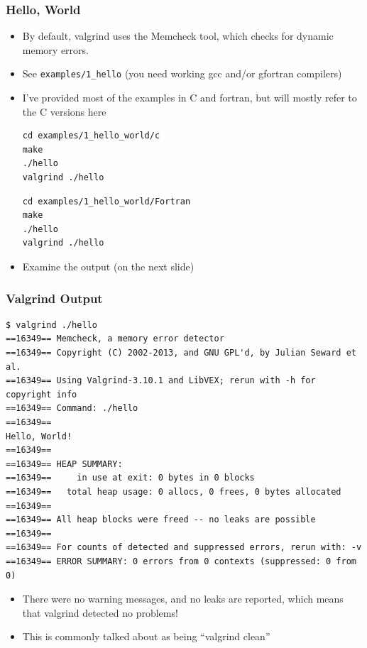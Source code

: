 \documentclass{beamer}
\begin{document}
\begin{frame}[fragile]
\frametitle{Hello, World}
\begin{itemize}
\item By default, valgrind uses the Memcheck tool, which checks for dynamic memory errors.
\item See \texttt{examples/1\_hello} (you need working gcc and/or gfortran compilers)
  \item I've provided most of the examples in C and fortran, but will mostly refer to the C versions here
\begin{lstlisting}
cd examples/1_hello_world/c
make
./hello
valgrind ./hello
\end{lstlisting}
\begin{lstlisting}
cd examples/1_hello_world/Fortran
make
./hello
valgrind ./hello
\end{lstlisting}
\item Examine the output (on the next slide)
\end{itemize}
\end{frame}

\begin{frame}[fragile]
  \frametitle{Valgrind Output}
  \begin{lstlisting}
$ valgrind ./hello
==16349== Memcheck, a memory error detector
==16349== Copyright (C) 2002-2013, and GNU GPL'd, by Julian Seward et al.
==16349== Using Valgrind-3.10.1 and LibVEX; rerun with -h for copyright info
==16349== Command: ./hello
==16349==
Hello, World!
==16349==
==16349== HEAP SUMMARY:
==16349==     in use at exit: 0 bytes in 0 blocks
==16349==   total heap usage: 0 allocs, 0 frees, 0 bytes allocated
==16349==
==16349== All heap blocks were freed -- no leaks are possible
==16349==
==16349== For counts of detected and suppressed errors, rerun with: -v
==16349== ERROR SUMMARY: 0 errors from 0 contexts (suppressed: 0 from 0)
\end{lstlisting}
\begin{itemize}
\item There were no warning messages, and no leaks are reported, which means that valgrind detected no problems!
\item This is commonly talked about as being ``valgrind clean''
\end{itemize}



\end{frame}
\end{document}
